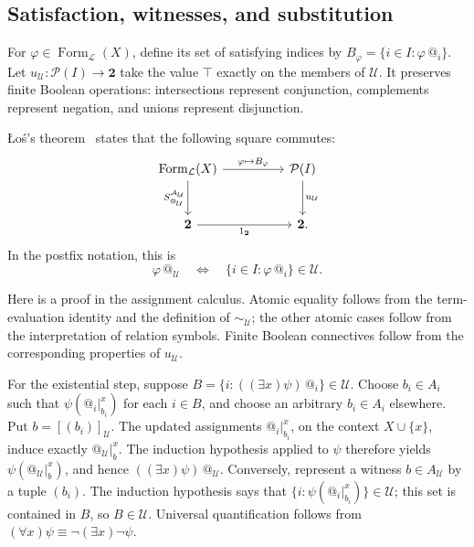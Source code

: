 \documentclass[11pt]{article}
\makeatletter
\newcommand{\atsign}{\mathord{@}}
\theoremstyle{definition}
\makeatother
\begin{document}
\subsection{Satisfaction, witnesses, and substitution}

For \(\varphi\in\operatorname{Form}_{\mathcal L}(X)\), define its set of
satisfying indices by
\(B_\varphi=\{i\in I:\varphi\,\atsign_i\}\).
Let \(u_{\mathcal U}:\mathcal P(I)\to\mathbf2\) take the value
\(\top\) exactly on the members of \(\mathcal U\). It preserves finite
Boolean operations: intersections represent conjunction, complements
represent negation, and unions represent disjunction.

\L{}o\'s's theorem~\cite[Corollary~10]{LurieUltraproducts} states that the
following square commutes:
\[
\begin{tikzcd}[row sep=large,column sep=huge]
\operatorname{Form}_{\mathcal L}(X)
  \arrow[r,"\varphi\mapsto B_\varphi"]
  \arrow[d,"S^{\mathcal A_{\mathcal U}}_{\atsign_{\mathcal U}}"'] &
\mathcal P(I) \arrow[d,"u_{\mathcal U}"] \\
\mathbf2 \arrow[r,"1_{\mathbf2}"'] & \mathbf2.
\end{tikzcd}
\]
In the postfix notation, this is
\[
\boxed{\varphi\,\atsign_{\mathcal U}
\quad\Longleftrightarrow\quad
\{i\in I:\varphi\,\atsign_i\}\in\mathcal U.}
\]

Here is a proof in the assignment calculus. Atomic equality follows from
the term-evaluation identity and the definition of
\(\sim_{\mathcal U}\); the other atomic cases follow from the
interpretation of relation symbols. Finite Boolean connectives follow
from the corresponding properties of \(u_{\mathcal U}\).

For the existential step, suppose
\(B=\{i:((\exists x)\psi)\,\atsign_i\}\in\mathcal U\).
Choose \(b_i\in A_i\) such that
\(\psi(\atsign_i\vert_{b_i}^{x})\) for each \(i\in B\), and choose an
arbitrary \(b_i\in A_i\) elsewhere. Put \(b=[(b_i)]_{\mathcal U}\).
The updated assignments \(\atsign_i\vert_{b_i}^{x}\), on the context
\(X\cup\{x\}\), induce exactly
\(\atsign_{\mathcal U}\vert_b^{x}\). The induction hypothesis applied to
\(\psi\) therefore yields
\(\psi(\atsign_{\mathcal U}\vert_b^{x})\), and hence
\(((\exists x)\psi)\,\atsign_{\mathcal U}\).
Conversely, represent a witness \(b\in A_{\mathcal U}\) by a tuple
\((b_i)\). The induction hypothesis says that
\(\{i:\psi(\atsign_i\vert_{b_i}^{x})\}\in\mathcal U\); this set is
contained in \(B\), so \(B\in\mathcal U\).
Universal quantification follows from
\((\forall x)\psi\equiv\neg(\exists x)\neg\psi\).
\end{document}

